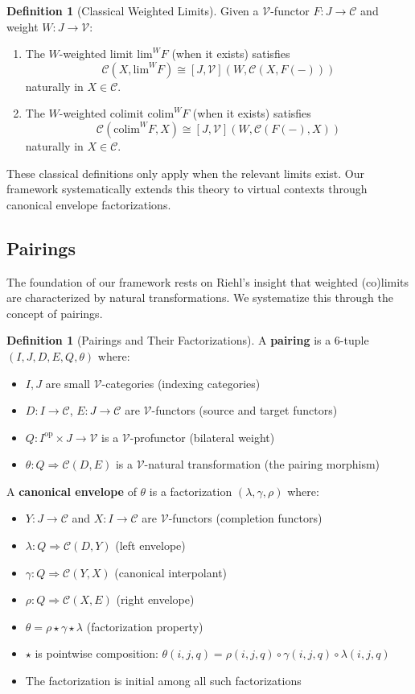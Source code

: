 \documentclass[11pt]{article}
\theoremstyle{plain}
\theoremstyle{definition}
\newtheorem{definition}[theorem]{Definition}
\theoremstyle{remark}
\newcommand{\V}{\mathcal{V}}
\newcommand{\C}{\mathcal{C}}
\newcommand{\op}{\mathrm{op}}
\newcommand{\colim}{\mathrm{colim}}
\renewcommand{\lim}{\mathrm{lim}}
\begin{document}
\begin{definition}[Classical Weighted Limits]
Given a $\V$-functor $F : J \to \C$ and weight $W : J \to \V$:
\begin{enumerate}
\item The $W$-weighted limit $\lim^W F$ (when it exists) satisfies 
\[
\C(X, \lim^W F) \cong [J, \V](W, \C(X, F(-)))
\]
naturally in $X \in \C$.

\item The $W$-weighted colimit $\colim^W F$ (when it exists) satisfies
\[
\C(\colim^W F, X) \cong [J, \V](W, \C(F(-), X))
\]
naturally in $X \in \C$.
\end{enumerate}
\end{definition}

These classical definitions only apply when the relevant limits exist. Our framework systematically extends this theory to virtual contexts through canonical envelope factorizations.

\subsection{Pairings}

The foundation of our framework rests on Riehl's insight \cite{riehl2008weighted,riehl2014categorical} that weighted (co)limits are characterized by natural transformations. We systematize this through the concept of pairings.

\begin{definition}[Pairings and Their Factorizations]
A \textbf{pairing} is a 6-tuple $(I, J, D, E, Q, \theta)$ where:
\begin{itemize}
\item $I, J$ are small $\V$-categories (indexing categories)
\item $D : I \to \C$, $E : J \to \C$ are $\V$-functors (source and target functors)
\item $Q : I^{\op} \times J \to \V$ is a $\V$-profunctor (bilateral weight)
\item $\theta : Q \Rightarrow \C(D, E)$ is a $\V$-natural transformation (the pairing morphism)
\end{itemize}

A \textbf{canonical envelope} of $\theta$ is a factorization $(\lambda, \gamma, \rho)$ where:
\begin{itemize}
\item $Y : J \to \C$ and $X : I \to \C$ are $\V$-functors (completion functors)
\item $\lambda : Q \Rightarrow \C(D, Y)$ (left envelope)
\item $\gamma : Q \Rightarrow \C(Y, X)$ (canonical interpolant)
\item $\rho : Q \Rightarrow \C(X, E)$ (right envelope)
\item $\theta = \rho \star \gamma \star \lambda$ (factorization property)
\item $\star$ is pointwise composition: $\theta(i,j,q) = \rho(i,j,q) \circ \gamma(i,j,q) \circ \lambda(i,j,q)$
\item The factorization is initial among all such factorizations
\end{itemize}
\end{definition}
\end{document}
